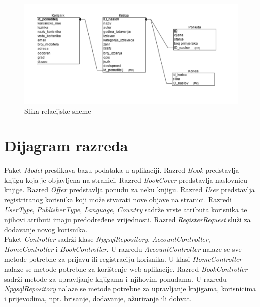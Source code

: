 		\begin{figure}[hbt!]
			\centering
			\includegraphics[width = \textwidth]{slike/Relacijska shema}
			\caption{Slika relacijske sheme}
			\label{fig:enter-label}
		\end{figure}
		
		\eject
			
		\section{Dijagram razreda}
		
			Paket \textit{Model} preslikava bazu podataka u aplikaciji. Razred \textit{Book} predstavlja knjigu koja je objavljena na stranici. Razred \textit{BookCover} predstavlja naslovnicu knjige. Razred \textit{Offer} predstavlja ponudu za neku knjigu. Razred \textit{User} predstavlja registriranog korisnika koji može stvarati nove objave na stranici. Razredi \textit{UserType}, \textit{PublisherType}, \textit{Language}, \textit{Country} sadrže vrste atributa korisnika te njihovi atributi imaju predodređene vrijednosti. Razred \textit{RegisterRequest} služi za dodavanje novog korisnika.\\
				
			Paket \textit{Controller} sadrži klase \textit{NpgsqlRepository}, \textit{AccountController}, \textit{HomeController} i \textit{BookController}. U razredu \textit{AccountController} nalaze se sve metode potrebne za prijavu ili registraciju korisnika. U klasi \textit{HomeController} nalaze se metode potrebne za korištenje web-aplikacije. Razred \textit{BookController} sadrži metode za upravljanje knjigama i njihovim ponudama. U razredu \textit{NpgsqlRepository} nalaze se metode potrebne za upravljanje knjigama, korisnicima i prijevodima, npr. brisanje, dodavanje, ažuriranje ili dohvat.\\
			
			\clearpage
			
